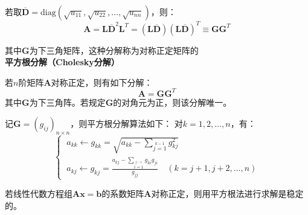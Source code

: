     若取$\overline{\boldsymbol{D}}=\mathrm{diag} (\sqrt{u_{11}},\sqrt{u_{22}},\dots,\sqrt{u_{nn}})$，则：
    \begin{equation*}
        \boldsymbol{A}=\boldsymbol{L}\overline{\boldsymbol{D}}^2 \boldsymbol{L}^T = (\boldsymbol{L\overline{D}})(\boldsymbol{L\overline{D}})^T \equiv \boldsymbol{GG}^T
    \end{equation*}
    
    其中$\boldsymbol{G}$为下三角矩阵，这种分解称为对称正定矩阵的\textbf{平方根分解（Cholesky分解）}

\begin{th4}
    若$n$阶矩阵$\boldsymbol{A}$对称正定，则有如下分解：
    \begin{equation}
        \boldsymbol{A} = \boldsymbol{GG}^{T}
    \end{equation}
    其中$\boldsymbol{G}$为下三角阵。若规定$\boldsymbol{G}$的对角元为正，则该分解唯一。
\end{th4}

记$\boldsymbol{G}=(g_{ij})_{n \times n}$，则平方根分解算法如下：
对$k=1,2,\dots,n$，有：
\begin{equation}
    \begin{cases}
        \ a_{kk} \leftarrow g_{kk} = \sqrt{a_{kk} - \sum\limits_{j=1}\limits^{k-1} g^{2}_{kj}} \\[5mm]
        \ a_{kj} \leftarrow g_{kj} = {\displaystyle \frac{a_{kj} - \sum\limits_{i=1}\limits^{j-1}g_{ki}g_{ji}}{g_{jj}}} \quad (k=j+1,j+2,\dots,n) 
    \end{cases}
\end{equation}

\begin{th4}
    若线性代数方程组$\boldsymbol{Ax} = \boldsymbol{b}$的系数矩阵$\boldsymbol{A}$对称正定，则用平方根法进行求解是稳定的。
\end{th4}


